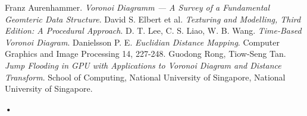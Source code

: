\documentclass[12pt]{article}
\begin{document}
\pagebreak

\begin{thebibliography}{10}
 Franz Aurenhammer. \textit{Voronoi Diagramm --- A Survey of a Fundamental Geomteric Data Structure}.
 David S. Elbert et al. \textit{Texturing and Modelling, Third Edition: A Procedural Approach}.
 D. T. Lee, C. S. Liao, W. B. Wang. \textit{Time-Based Voronoi Diagram}.
 Danielsson P. E. \textit{Euclidian Distance Mapping}. Computer Graphics and Image Processing 14, 227-248.
 Guodong Rong, Tiow-Seng Tan. \textit{Jump Flooding in GPU with Applications to Voronoi Diagram and Distance Transform}. School of Computing, National University of Singapore, National University of Singapore. 
\end{thebibliography}

\textbf{•}
\end{document}
